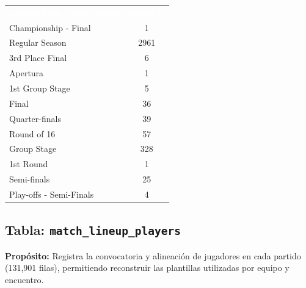 \documentclass[12pt,a4paper]{article}
\newcommand{\thead}[1]{%
  \cellcolor{tableheader}\textcolor{white}{\textbf{#1}}%
}
\begin{document}
\begin{center}
\small
\begin{tabular}{lc}
\rowcolor{tableheader}
\thead{competition\_stage\_name} & \thead{count(1)} \\

\rowcolor{tablealt} Championship - Final & 1 \\
\rowcolor{tablerow} Regular Season & 2961 \\
\rowcolor{tablealt} 3rd Place Final & 6 \\
\rowcolor{tablerow} Apertura & 1 \\
\rowcolor{tablealt} 1st Group Stage & 5 \\
\rowcolor{tablerow} Final & 36 \\
\rowcolor{tablealt} Quarter-finals & 39 \\
\rowcolor{tablerow} Round of 16 & 57 \\
\rowcolor{tablealt} Group Stage & 328 \\
\rowcolor{tablerow} 1st Round & 1 \\
\rowcolor{tablealt} Semi-finals & 25 \\
\rowcolor{tablerow} Play-offs - Semi-Finals & 4 \\

\end{tabular}
\end{center}

\subsection{Tabla: \texttt{match\_lineup\_players}}

\textbf{Propósito:} Registra la convocatoria y alineación de jugadores en cada partido (131,901 filas), permitiendo reconstruir las plantillas utilizadas por equipo y encuentro.
\end{document}
